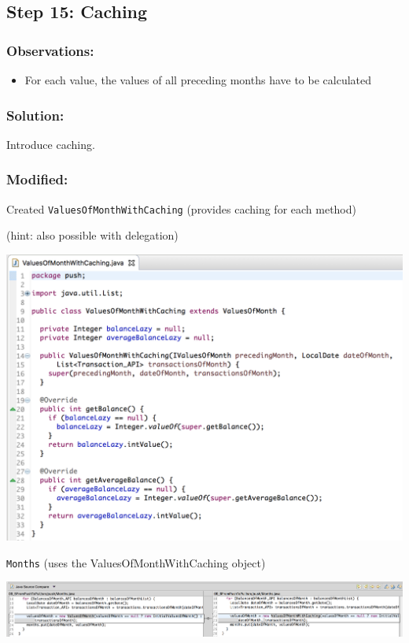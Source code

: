 \documentclass[a4paper,fleqn,titlepage,11pt]{article}
\begin{document}
\subsection*{Step 15: Caching}

\subsubsection*{Observations:}
\begin{itemize}
\item For each value, the values of all preceding months have to be calculated
\end{itemize}

\subsubsection*{Solution:}

Introduce caching.

\subsubsection*{Modified:}

Created \texttt{ValuesOfMonthWithCaching} (provides caching for each method)

(hint: also possible with delegation)

\includegraphics[width=1\textwidth]{CompareViews/15-1.png}

\texttt{Months} (uses the ValuesOfMonthWithCaching object)

\includegraphics[width=1\textwidth]{CompareViews/14-15-2.png}
\end{document}
